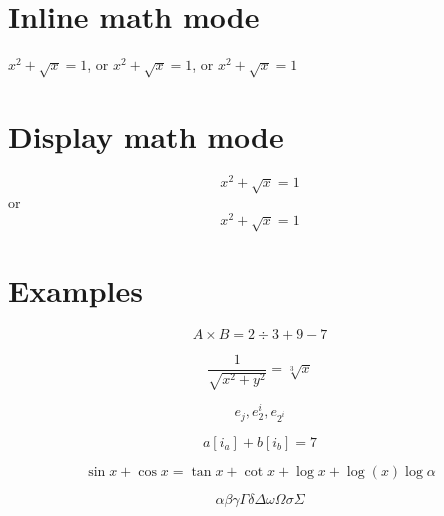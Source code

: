 \documentclass[12pt, a4paper]{article}
\begin{document}
\section{Inline math mode}

\begin{math}
    x^2 + \sqrt{x} = 1
\end{math}, or $ x^2 + \sqrt{x} = 1 $, or \( x^2 + \sqrt{x} = 1 \)



\section{Display math mode}

\begin{equation}
    x^2 + \sqrt{x} = 1
\end{equation} or \[ x^2 + \sqrt{x} = 1 \]



\section{Examples}

\[ A \times B = 2 \div 3 + 9 - 7 \]

\[ \frac{1}{\sqrt{x^2 + y^2}} = \sqrt[3]{x} \]

\[ e_j, e_2^i, e_{2^i} \]

\[ a[i_a] + b[i_b] = 7 \]

\[ \sin x + \cos x = \tan x + \cot x + \log x + \log(x) \log \alpha \]

\[ \alpha \beta \gamma \Gamma \delta \Delta \omega \Omega \sigma \Sigma \]
\end{document}
